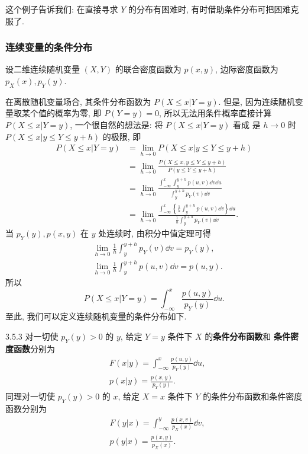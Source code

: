 	这个例子告诉我们: 在直接寻求 $Y$ 的分布有困难时, 有时借助条件分布可把困难克服了.

	\subsubsection{连续变量的条件分布}

	设二维连续随机变量 $(X,Y)$ 的联合密度函数为 $p(x,y)$, 边际密度函数为 $p_X(x),p_Y(y)$.

	在离散随机变量场合, 其条件分布函数为 $P(X\leq x|Y=y)$. 但是, 因为连续随机变量取某个值的概率为零, 即 $P(Y=y)=0$, 
	所以无法用条件概率直接计算 $P(X\leq x|Y=y)$, 一个很自然的想法是: 将 $P(X\leq x|Y=y)$ 看成
	是 $h\to 0$ 时 $P(X\leq x|y\leq Y\leq y+h)$ 的极限, 即
	\begin{align*}
		P(X \leq  x | Y=y) &=\lim _{h \to 0} P(X \leq  x | y \leq  Y \leq  y+h) \\
		&=\lim _{h \to 0} \frac{P(X \leq  x, y \leq  Y \leq  y+h)}{P(y \leq  Y \leq  y+h)}\\
		&=\lim _{h \to 0} \frac{\int_{-\infty}^{x} \int_{y}^{y+h} p(u, v) \dd v \dd u}{\int_{y}^{y+h} p_{Y}(v) \dd v} \\
		&=\lim _{h \to 0} \frac{\int_{-\infty}^{x} \left\{ \frac{1}{h} \int_{y}^{y+h} p(u, v) \dd v \right\} \dd u}
		{\frac{1}{h} \int_{y}^{y+h} p_{Y}(v) \dd v}.
	\end{align*}
	当 $p_Y(y),p(x,y)$ 在 $y$ 处连续时, 由积分中值定理可得
	\begin{align*}
		&\lim _{h \to 0} \frac{1}{h} \int_{y}^{y+h} p_{Y}(v) \dd v=p_{Y}(y), \\
		&\lim _{h \to 0} \frac{1}{h} \int_{y}^{y+h} p(u, v) \dd v=p(u, y).
	\end{align*}
	所以
	\[
		P(X \leq x | Y=y)=\int_{-\infty}^{x} \frac{p(u, y)}{p_{Y}(y)} \dd u.
	\]
	至此, 我们可以定义连续随机变量的条件分布如下.
	\begin{definition}{}{3.5.3}
		对一切使 $p_Y(y)>0$ 的 $y$, 给定 $Y=y$ 条件下 $X$ 的\textbf{条件分布函数}和
		\textbf{条件密度函数}分别为
		\begin{align}
		 	&F(x | y)=\int_{-\infty}^{x} \frac{p(u, y)}{p_{Y}(y)} \dd u, \label{eq:3.5.5}\\
		 	&p(x | y)=\frac{p(x, y)}{p_{Y}(y)}.	\label{eq:3.5.6}
		\end{align}
		同理对一切使 $p_Y(y)>0$ 的 $x$, 给定 $X=x$ 条件下 $Y$ 的条件分布函数和条件密度函数分别为
		\begin{align}
			&F(y | x)=\int_{-\infty}^{y} \frac{p(x, v)}{p_{X}(x)} \dd v ,\label{eq:3.5.7}\\
		 	&p(y | x)=\frac{p(x, y)}{p_{X}(x)}	\label{eq:3.5.8}.
		\end{align}
	\end{definition}
